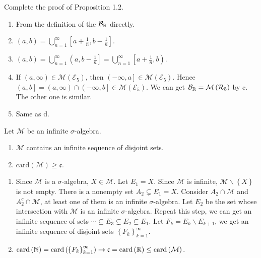 \begin{exe}
  Complete the proof of Proposition 1.2.
\end{exe}

\begin{sol}
  \begin{enumerate}
    \item From the definition of the $\mathcal{B}_{\mathbb{R}}$ directly.
    \item $\left( a,b \right) =\bigcup_{n=1} ^{\infty}\left[ a+\frac{1}{n},b-\frac{1}{n} \right]  $.
  \item $\left( a,b \right) =\bigcup_{n=1} ^{\infty}\left(a,b-\frac{1}{n}\right]=\bigcup_{n=1} ^{\infty}\left[a+\frac{1}{n},b\right)$.
  \item If $\left( a,\infty \right) \in \mathcal{M}\left( \mathcal{E}_5 \right) $, then $\left(-\infty,a\right]\in \mathcal{M}\left( \mathcal{E}_5 \right) $. Hence $\left(a,b  \right]=\left(a,\infty\right)\cap \left(-\infty,b\right]\in \mathcal{M}\left( \mathcal{E}_5 \right)  $. We can get $\mathcal{B}_{\mathbb{R}}=\mathcal{M}\left( \mathcal{R}_{5} \right) $ by c. The other one is similar.
  \item Same as d.
  \end{enumerate}
\end{sol}
\begin{exe}
  Let $\mathcal{M}$ be an infinite $\sigma$-algebra.
  \begin{enumerate}
    \item $\mathcal{M}$ contains an infinite sequence of disjoint sets.
    \item $\text{card}\left( \mathcal{M} \right) \ge \mathfrak{c}$.
  \end{enumerate}
\end{exe}
\begin{sol}
  \begin{enumerate}
    \item  Since $\mathcal{M}$ is a $\sigma$-algebra, $X\in \mathcal{M}$. Let $E_1=X$. Since $\mathcal{M}$ is infinite, $\mathcal{M}\backslash \left\{ X \right\} $ is not empty. There is a nonempty set $A_2\subsetneq E_1=X$. Consider $A_2\cap \mathcal{M}$ and $A_2^{c}\cap \mathcal{M}$, at least one of them is an infinite $\sigma$-algebra. Let $E_2$ be the set whose intersection with  $\mathcal{M}$ is an infinite $\sigma$-algebra. Repeat this step, we can get an infinite sequence of sets  $\cdots\subsetneq E_3\subsetneq E_2\subsetneq E_1$. Let  $F_k=E_k\backslash E_{k+1}$, we get an infinite sequence of disjoint sets  $\left\{ F_k \right\}_{k=1}^{\infty}$.
    \item $\text{card}\left( \mathbb{N} \right) =\text{card}\left( \left\{ F_k \right\}_{k=1}^{\infty} \right)\to \mathfrak{c}=\text{card}\left( \mathbb{R} \right)\leq \text{card}\left( \mathcal{M} \right) $.  
  \end{enumerate}
\end{sol}
